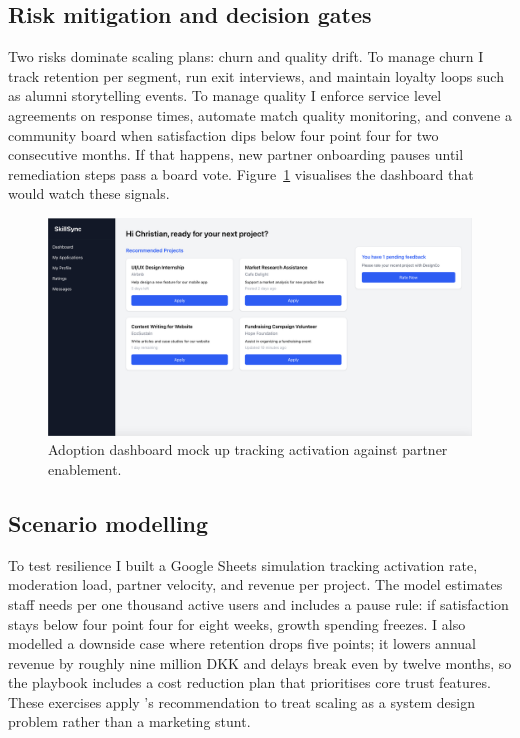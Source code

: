 \subsection*{Risk mitigation and decision gates}
Two risks dominate scaling plans: churn and quality drift. To manage churn I track retention per segment, run exit interviews, and maintain loyalty loops such as alumni storytelling events. To manage quality I enforce service level agreements on response times, automate match quality monitoring, and convene a community board when satisfaction dips below four point four for two consecutive months. If that happens, new partner onboarding pauses until remediation steps pass a board vote. Figure~\ref{fig:scaling-dashboard} visualises the dashboard that would watch these signals.

\begin{figure}[H]
  \centering
  \includegraphics[width=0.75\linewidth]{figures/Student-Dashboard.png}
  \caption{Adoption dashboard mock up tracking activation against partner enablement.}
  \label{fig:scaling-dashboard}
\end{figure}

\subsection*{Scenario modelling}
To test resilience I built a Google Sheets simulation tracking activation rate, moderation load, partner velocity, and revenue per project. The model estimates staff needs per one thousand active users and includes a pause rule: if satisfaction stays below four point four for eight weeks, growth spending freezes. I also modelled a downside case where retention drops five points; it lowers annual revenue by roughly nine million DKK and delays break even by twelve months, so the playbook includes a cost reduction plan that prioritises core trust features. These exercises apply \citet{Lecture12}'s recommendation to treat scaling as a system design problem rather than a marketing stunt.
